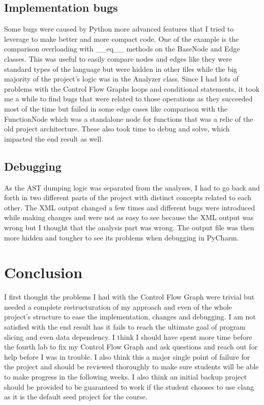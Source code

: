 \documentclass[conference,compsoc]{IEEEtran}
\begin{document}
\subsection{Implementation bugs}
Some bugs were caused by Python more advanced features that I tried to leverage to make better and more compact code.
 One of the example is the comparison overloading with \_\_eq\_\_ methods on the BaseNode and Edge classes. This was useful to
 easily compare nodes and edges like they were standard types of the language but were hidden in other files while the big
 majority of the project's logic was in the Analyzer class. Since I had lots of problems with the Control Flow Graphs loops
 and conditional statements, it took me a while to find bugs that were related to those operations as they succeeded most of the time
 but failed in some edge cases like comparison with the FunctionNode which was a standalone node for functions that was a relic
 of the old project architecture. These also took time to debug and solve, which impacted the end result as well.

\subsection{Debugging}
 As the AST dumping logic was separated from the analyses, I had to go back and forth in two different parts of the project with distinct
 concepts related to each other. The XML output changed a few times and different bugs were introduced while making changes and were not as
 easy to see because the XML output was wrong but I thought that the analysis part was wrong. The output file was then more hidden and 
 tougher to see its problems when debugging in PyCharm.

\section{Conclusion}

I first thought the problems I had with the Control Flow Graph were trivial but needed a complete restructuration of my
 approach and even of the whole project's structure to ease the implementation, changes and debugging. I am not satisfied
 with the end result has it fails to reach the ultimate goal of program slicing and even data dependency. I think I should have spent
 more time before the fourth lab to fix my Control Flow Graph and ask questions and reach out for help before I was in trouble.
 I also think this a major single point of failure for the project and should be reviewed thoroughly to make sure students will
 be able to make progress in the following weeks. I also think an initial backup project should be provided to be guaranteed to work
 if the student chooses to use clang as it is the default seed project for the course.
\end{document}
